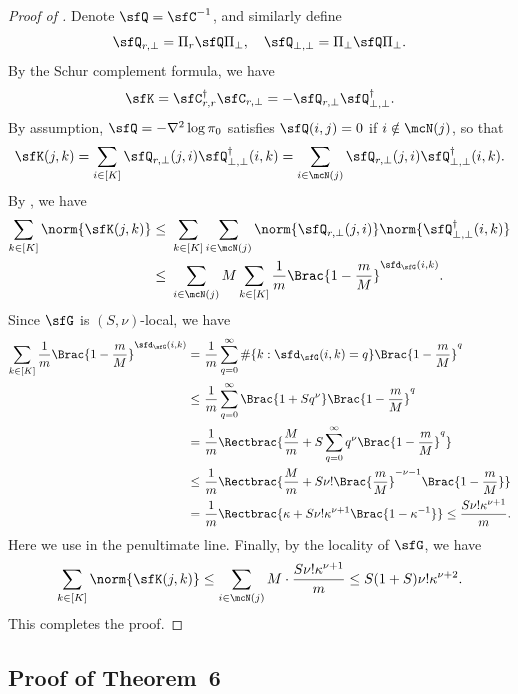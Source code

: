 \documentclass[11pt]{article}
\begin{document}
\begin{proof}[Proof of ]

Denote $\sfQ = \sfC^{-1}$, and similarly define 
\[
    \sfQ_{r,\bot} = \Pi_r \sfQ \Pi_\bot, \quad \sfQ_{\bot,\bot} = \Pi_\bot \sfQ \Pi_\bot.
\]
By the Schur complement formula, we have
\[
    \sfK = \sfC_{r,r}^\dag \sfC_{r,\bot} = - \sfQ_{r,\bot} \sfQ_{\bot,\bot}^\dag. 
\]
By assumption, $\sfQ = - \nabla^2\log \pi_0$ satisfies $\sfQ(i,j) = 0$ if $i \notin \mcN(j)$, so that 
\[
    \sfK(j,k) = \sum_{i \in [K]} \sfQ_{r,\bot}(j,i) \sfQ_{\bot,\bot}^\dag(i,k) = \sum_{i \in \mcN(j)} \sfQ_{r,\bot}(j,i) \sfQ_{\bot,\bot}^\dag(i,k).
\]
By , we have 
\begin{align*}
    \sum_{k\in [K]} \norm{ \sfK(j,k) } \le~& \sum_{k\in [K]} \sum_{i \in \mcN(j)} \norm{ \sfQ_{r,\bot}(j,i) } \norm{ \sfQ_{\bot,\bot}^\dag(i,k) } \\
    \le~& \sum_{i \in \mcN(j)} M \sum_{k \in [K]} \frac{1}{m} \Brac{ 1 - \frac{m}{M} }^{\sfd_\sfG(i,k)}.
\end{align*}
Since $\sfG$ is $(S,\nu)$-local, we have
\begin{align*}
    \sum_{k \in [K]} \frac{1}{m} \Brac{ 1 - \frac{m}{M} }^{\sfd_\sfG(i,k)} =~& \frac{1}{m} \sum_{q=0}^\infty \#\{ k: \sfd_\sfG(i,k) = q \} \Brac{ 1 - \frac{m}{M} }^q \\
    \le~& \frac{1}{m} \sum_{q=0}^\infty \Brac{ 1 + S q^\nu } \Brac{ 1 - \frac{m}{M} }^q \\
    =~& \frac{1}{m} \Rectbrac{ \frac{M}{m} + S \sum_{q=0}^\infty q^\nu \Brac{ 1 - \frac{m}{M} }^q } \\
    \le~& \frac{1}{m} \Rectbrac{ \frac{M}{m} + S \nu! \Brac{ \frac{m}{M} }^{-\nu-1} \Brac{ 1 - \frac{m}{M} } } \\
    =~& \frac{1}{m} \Rectbrac{ \kappa + S \nu! \kappa^{\nu+1} \Brac{ 1 - \kappa^{-1} } } \le \frac{S \nu! \kappa^{\nu+1}}{m}. 
\end{align*}
Here we use  in the penultimate line. Finally, by the locality of $\sfG$, we have 
\[
    \sum_{k\in[K]} \norm{ \sfK(j,k) } \le \sum_{i \in \mcN(j)} M \cdot \frac{S \nu! \kappa^{\nu+1}}{m} \le S(1+S) \nu! \kappa^{\nu+2}. 
\]
This completes the proof. 
\end{proof}





\subsection{Proof of Theorem~6}
\end{document}
